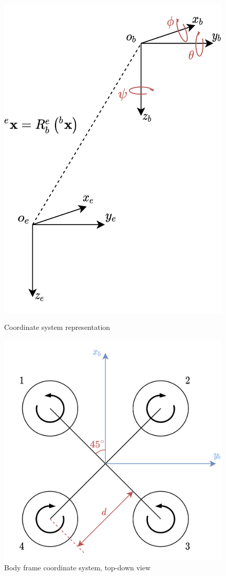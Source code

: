 \documentclass{article}
\begin{document}
	\begin{figure}[H]
		\centering
		\begin{minipage}[t]{0.48\linewidth}
			\centering
			\includegraphics[height = \linewidth]{3DCoordinateSystems.png}
			\caption{Coordinate system representation}
			\label{fig:coord_sys}
		\end{minipage}
		\begin{minipage}[t]{0.48\linewidth}
			\centering
			\includegraphics[height = \linewidth]{BodyFrameDiagram.png}
			\caption{Body frame coordinate system, top-down view}
			\label{fig:body_frame}
		\end{minipage}
	\end{figure}
\end{document}
